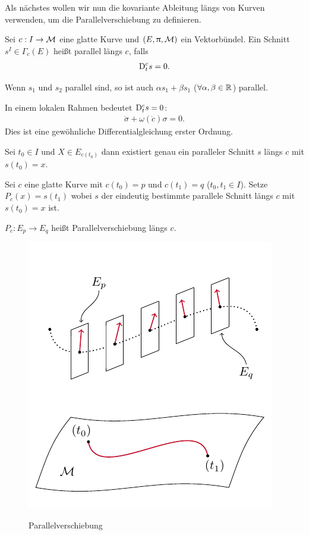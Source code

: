 Als nächstes wollen wir nun die kovariante Ableitung längs von Kurven verwenden, um die Parallelverschiebung zu definieren.
\begin{defs}[Parallelität]
Sei $c: I \to \mathcal{M}$ eine glatte Kurve und $(E, \uppi, \mathcal{M})$ ein Vektorbündel.
Ein Schnitt $s^I \in \Gamma_c (E)$ heißt parallel längs $c$, falls 
\begin{align}
\mathrm{D}^c_t s = 0.
\end{align}
\end{defs}
\begin{bem}
Wenn $s_1$ und $s_2$ parallel sind, so ist auch $\alpha s_1 + \beta s_1$ ($\forall \alpha, \beta \in \mathbb{R}$) parallel.
\end{bem}
In einem lokalen Rahmen bedeutet $\mathrm{D}^c_t s = 0$:
\begin{align}
\dot{\sigma} + \omega(\dot{c}) \sigma = 0.
\end{align}
Dies ist eine gewöhnliche Differentialgleichung erster Ordnung.
\begin{lem}
Sei $t_0 \in I$ und $X \in E_{c(t_0)}$ dann existiert genau ein paralleler Schnitt $s$ längs $c$ mit $s(t_0) = x$.
\end{lem}
Sei $c$ eine glatte Kurve mit $c(t_0) = p$ und $c(t_1)=q$ ($t_0, t_1 \in I$).
Setze $P_c(x) = s(t_1)$ wobei $s$ der eindeutig bestimmte parallele Schnitt längs $c$ mit $s(t_0) = x$ ist.
\begin{defs}[Parallelverschiebung]
$P_c : E_p \to E_q$ heißt Parallelverschiebung längs $c$.
\begin{figure}[H]
\centering
\includegraphics[width=0.7\linewidth]{figures/tikz/parallel_shift_dgl.pdf}
\label{img:parallel_shift:dgl}
\caption{Parallelverschiebung}
\end{figure} 
\end{defs}
